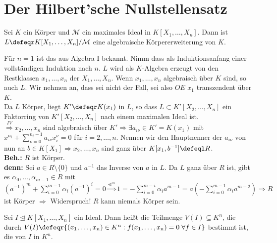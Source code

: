 \section{Der Hilbert'sche Nullstellensatz}

\begin{Satz}
\label{Satz5}
  Sei $K$ ein Körper und $\mathcal{M}$ ein maximales Ideal in $K[X_1, \dots,
  X_n]$. Dann ist $L \defeqr K[X_1, \dots, X_n] / \mathcal{M}$ eine algebraische
  Körpererweiterung von $K$.
\end{Satz}

\begin{Bew}
  Für $n=1$ ist das aus Algebra I bekannt. Nimm dass als Induktionsanfang einer
  vollständigen Induktion nach $n$.
  $L$ wird als $K$-Algebra erzeugt von den Restklassen $x_1, \dots, x_n$ der
  $X_1, \dots, X_n$. Wenn $x_1, \dots, x_n$ algebraisch über $K$ sind, so auch
  $L$. Wir nehmen an, dass sei nicht der Fall, sei also $O\!\!E$ $x_1$ transzendent
  über $K$.\\
  Da $L$ Körper, liegt $K' \defeqr K(x_1)$ in $L$, so dass $L \subset K'[X_2,
  \dots, X_n]$ ein Faktorring von $K'[X_2, \dots, X_n]$ nach einem maximalen
  Ideal ist.\\
  $\overset{IV}{\Rightarrow} x_2, \dots, x_n$ sind algebraisch über $K'
  \Rightarrow \exists a_{i \nu} \in K'=K(x_1)$ mit $x^{n_i} + \sum_{\nu =
  0}^{n_i -1} a_{i \nu} x_i^{\nu} = 0$ für $i = 2, \dots, n$.
  Nennen wir den Hauptnenner der $a_{i \nu}$ von nun an $b \in K[X_1] \Rightarrow
  x_2, \dots, x_n$ sind ganz über $K[x_1, b^{-1}] \defeql R$.\\
  \textbf{Beh.:} $R$ ist Körper.\\
  \textbf{denn:} Sei $a \in R \setminus \{0\}$ und $a^{-1}$ das Inverse von $a$
  in $L$. Da $L$ ganz über $R$ ist, gibt es $\alpha_0, \dots, \alpha_{m-1} \in
  R$ mit $(a^{-1})^m + \sum_{i = 0}^{m-1} \alpha_i (a^{-1})^i = 0 \overset{
  \cdot a^m}{\Rightarrow} 1 = -\sum_{i=0}^{m-i} \alpha_i a^{m-1} = a
  (-\sum_{i=0}^{m-1} \alpha_i a^{m-2}) \Rightarrow R$ ist Körper $\Rightarrow$
  Widerspruch! $R$ kann niemals Körper sein.
\end{Bew}

\begin{Def}
  Sei $I \trianglelefteq K[X_1, \dots, X_n]$ ein Ideal. Dann heißt die Teilmenge
  $V(I) \subseteq K^n$, die durch $V(I) \defeqr \{(x_1, \dots, x_n) \in K^n:
  f(x_1, \dots, x_n) = 0 \; \forall f \in I\}$ bestimmt ist, die
   von $I$ in $K^n$.
\end{Def}

